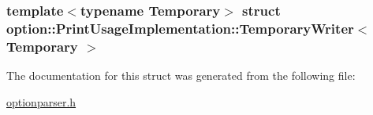 \subsubsection*{template$<$typename Temporary$>$ struct option\-::\-Print\-Usage\-Implementation\-::\-Temporary\-Writer$<$ Temporary $>$}



\-The documentation for this struct was generated from the following file\-:\begin{DoxyCompactItemize}
\item 
\hyperlink{optionparser_8h}{optionparser.\-h}\end{DoxyCompactItemize}

